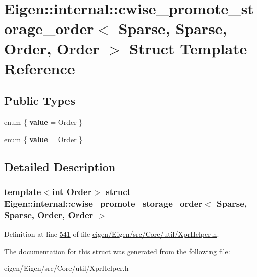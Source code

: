 \hypertarget{struct_eigen_1_1internal_1_1cwise__promote__storage__order_3_01_sparse_00_01_sparse_00_01_order_00_01_order_01_4}{}\section{Eigen\+:\+:internal\+:\+:cwise\+\_\+promote\+\_\+storage\+\_\+order$<$ Sparse, Sparse, Order, Order $>$ Struct Template Reference}
\label{struct_eigen_1_1internal_1_1cwise__promote__storage__order_3_01_sparse_00_01_sparse_00_01_order_00_01_order_01_4}
\subsection*{Public Types}
\begin{DoxyCompactItemize}
\item 
\mbox{\label{struct_eigen_1_1internal_1_1cwise__promote__storage__order_3_01_sparse_00_01_sparse_00_01_order_00_01_order_01_4_ab701318a95d605703455caf9b87a4760}} 
enum \{ {\bfseries value} = Order
 \}
\item 
\mbox{\label{struct_eigen_1_1internal_1_1cwise__promote__storage__order_3_01_sparse_00_01_sparse_00_01_order_00_01_order_01_4_af5b0879ec0bf84f76e8914034ced89f9}} 
enum \{ {\bfseries value} = Order
 \}
\end{DoxyCompactItemize}


\subsection{Detailed Description}
\subsubsection*{template$<$int Order$>$\newline
struct Eigen\+::internal\+::cwise\+\_\+promote\+\_\+storage\+\_\+order$<$ Sparse, Sparse, Order, Order $>$}



Definition at line \hyperlink{eigen_2_eigen_2src_2_core_2util_2_xpr_helper_8h_source_l00541}{541} of file \hyperlink{eigen_2_eigen_2src_2_core_2util_2_xpr_helper_8h_source}{eigen/\+Eigen/src/\+Core/util/\+Xpr\+Helper.\+h}.



The documentation for this struct was generated from the following file\+:\begin{DoxyCompactItemize}
\item 
eigen/\+Eigen/src/\+Core/util/\+Xpr\+Helper.\+h\end{DoxyCompactItemize}
